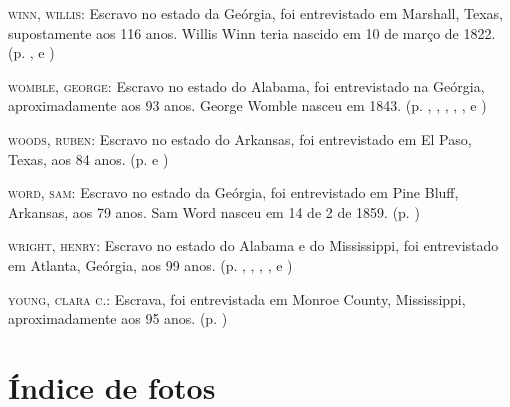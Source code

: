 \begin{Parskip}
\textsc{winn, willis:} Escravo no estado da Geórgia, foi entrevistado em
Marshall, Texas, supostamente aos 116 anos. Willis Winn teria nascido em
10 de março de 1822. (p. \pageref{ref303}, \pageref{ref304} e \pageref{ref305})

\textsc{womble, george:} Escravo no estado do Alabama, foi entrevistado
na Geórgia, aproximadamente aos 93 anos. George Womble nasceu em 1843. (p. \pageref{ref306}, \pageref{ref307}, \pageref{ref308}, \pageref{ref309}, \pageref{ref310}, \pageref{ref311} e \pageref{ref312})

\textsc{woods, ruben:} Escravo no estado do Arkansas, foi entrevistado
em El Paso, Texas, aos 84 anos. (p. \pageref{ref313} e \pageref{ref314}) 

\textsc{word, sam:} Escravo no estado da Geórgia, foi entrevistado em
Pine Bluff, Arkansas, aos 79 anos. Sam Word nasceu em 14 de 2 de 1859. (p. \pageref{ref315})

\textsc{wright, henry:} Escravo no estado do Alabama e do Mississippi,
foi entrevistado em Atlanta, Geórgia, aos 99 anos. (p. \pageref{ref316}, \pageref{ref317}, \pageref{ref318}, \pageref{ref319}, \pageref{ref320} e \pageref{ref321})

\textsc{young, clara c.:} Escrava, foi entrevistada em Monroe County,
Mississippi, aproximadamente aos 95 anos. (p. \pageref{ref322})
\end{Parskip}

\section{Índice de fotos}

